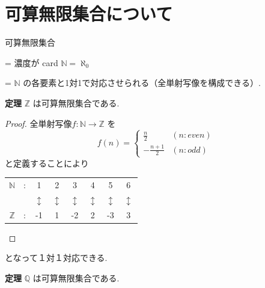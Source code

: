 \documentclass{jsarticle}
\begin{document}
\section*{可算無限集合について}

可算無限集合

= 濃度が card $\mathbb{N} = \aleph_{0}$

= $\mathbb{N}$ の各要素と1対1で対応させられる（全単射写像を構成できる）.

\bigskip

\begin{itembox}[l]{\textbf{定理}}
$\mathbb{Z}$ は可算無限集合である.
  \end{itembox}

\begin{proof}
  全単射写像$f : \mathbb{N} \to \mathbb{Z}$ を 
  \[f(n) = \begin{cases} \frac{n}{2} & (n : even) \\
                        -\frac{n+1}{2} & (n : odd)
           \end{cases}\]
  と定義することにより
  
  \begin{tabular}{cccccccc}
    $\mathbb{N}$ & : & 1 & 2 & 3 & 4 & 5 & 6 \\
&&$\updownarrow$&$\updownarrow$&$\updownarrow$&$\updownarrow$&$\updownarrow$&$\updownarrow$ \\
    $\mathbb{Z}$ & : & -1 & 1 & -2 & 2 & -3 & 3
  \end{tabular}
\end{proof}

となって１対１対応できる.

\vspace{5zw}


\begin{itembox}[l]{\textbf{定理}}
$\mathbb{Q}$ は可算無限集合である.
\end{itembox}
\end{document}
